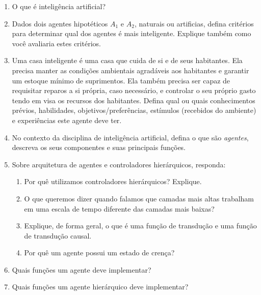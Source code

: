 \documentclass{article}
\begin{document}
\begin{enumerate}
\item O que é inteligência artificial?

\item Dados dois agentes hipotéticos $A_1$ e $A_2$, naturais ou artificias, defina critérios para determinar qual dos agentes é mais inteligente. Explique também como você avaliaria estes critérios.

\item Uma casa inteligente é uma casa que cuida de si e de seus habitantes. Ela precisa manter as condições ambientais agradáveis aos habitantes e garantir um estoque mínimo de suprimentos. Ela também precisa ser capaz de requisitar reparos a si própria, caso necessário, e controlar o seu próprio gasto tendo em visa os recursos dos habitantes. Defina qual ou quais conhecimentos prévios, habilidades, objetivos/preferências, estímulos (recebidos do ambiente) e experiências este agente deve ter.  

\item No contexto da disciplina de inteligência artificial, defina o que são \textit{agentes}, descreva os seus componentes e suas principais funções.

\item Sobre arquitetura de agentes e controladores hierárquicos, responda:
    \begin{enumerate}
        \item Por quê utilizamos controladores hierárquicos? Explique.
        \item O que queremos dizer quando falamos que camadas mais altas trabalham em uma escala de tempo diferente das camadas mais baixas?
        \item Explique, de forma geral, o que é uma função de transdução e uma função de transdução causal.
        \item Por quê um agente possui um estado de crença?
    \end{enumerate}

\item Quais funções um agente deve implementar?

\item Quais funções um agente hierárquico deve implementar?

\end{enumerate}
\end{document}
